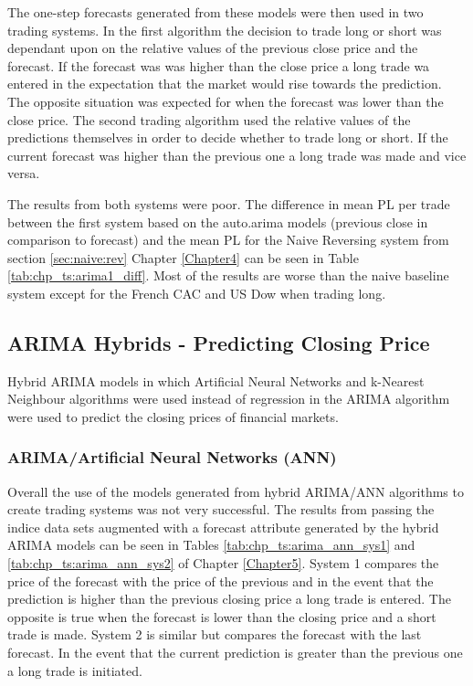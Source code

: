 

The one-step forecasts generated from these models were then used in two trading systems. In the first algorithm the decision to trade long or short was dependant upon on the relative values of the previous close price and the forecast. If the forecast was was higher than the close price a long trade wa entered in the expectation that the market would rise towards the prediction. The opposite situation was expected for when the forecast was lower than the close price. The second trading algorithm used the relative values of the predictions themselves in order to decide whether to trade long or short. If the current forecast was higher than the previous one a long trade was made and vice versa.

The results from both systems were poor. The difference in mean PL per trade between the first system based on the auto.arima models (previous close in comparison to forecast) and the mean PL for the Naive Reversing system from section \ref{sec:naive:rev} Chapter \ref{Chapter4} can be seen in Table \ref{tab:chp_ts:arima1_diff}. Most of the results are worse than the naive baseline system except for the French CAC and US Dow when trading long.



\subsection{ARIMA Hybrids - Predicting Closing Price}
Hybrid ARIMA models in which Artificial Neural Networks and k-Nearest Neighbour algorithms were used instead of regression in the ARIMA algorithm were used to predict the closing prices of financial markets. 

\subsubsection{ARIMA/Artificial Neural Networks (ANN)}
Overall the use of the models generated from hybrid ARIMA/ANN algorithms to create trading systems was not very successful. The results from passing the indice data sets augmented with a forecast attribute generated by the hybrid ARIMA models can be seen in Tables  \ref{tab:chp_ts:arima_ann_sys1} and \ref{tab:chp_ts:arima_ann_sys2} of Chapter \ref{Chapter5}. System 1 compares the price of the forecast with the price of the previous and in the event that the prediction is higher than the previous closing price a long trade is entered. The opposite is true when the forecast is lower than the closing price and a short trade is made. System 2 is similar but compares the forecast with the last forecast. In the event that the current prediction is greater than the previous one a long trade is initiated.

